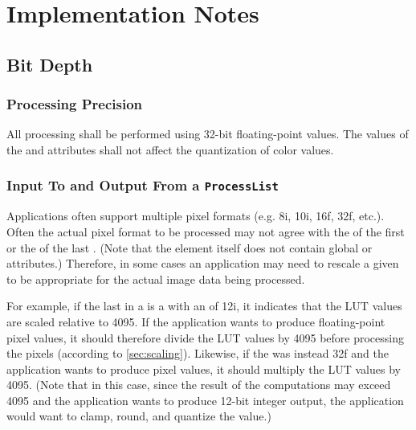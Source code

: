 \regularsectionformat
\chapter{Implementation Notes}
\label{sec:implementation}

\section{Bit Depth}

\subsection{Processing Precision} \label{sec:process-precision}
All processing shall be performed using 32-bit floating-point values. The values of the  and 
 attributes shall not affect the quantization of color values. 


\subsection{Input To and Output From a \texttt{ProcessList}} \label{sec:processList-in-out}
Applications often support multiple pixel formats (e.g. 8i, 10i, 16f, 32f, etc.). Often the actual pixel format to be processed may not agree with the  of the first  or the  of the last . (Note that the  element itself does not contain global  or  attributes.) Therefore, in some cases an application may need to rescale a given  to be appropriate for the actual image data being processed.

For example, if the last  in a  is a  with an  of 12i, it indicates that the LUT  values are scaled relative to 4095. If the application wants to produce floating-point pixel values, it should therefore divide the LUT  values by 4095 before processing the pixels (according to \ref{sec:scaling}). Likewise, if the  was instead 32f and the application wants to produce  pixel values, it should multiply the LUT  values by 4095. (Note that in this case, since the result of the computations may exceed 4095 and the application wants to produce 12-bit integer output, the application would want to clamp, round, and quantize the value.)


